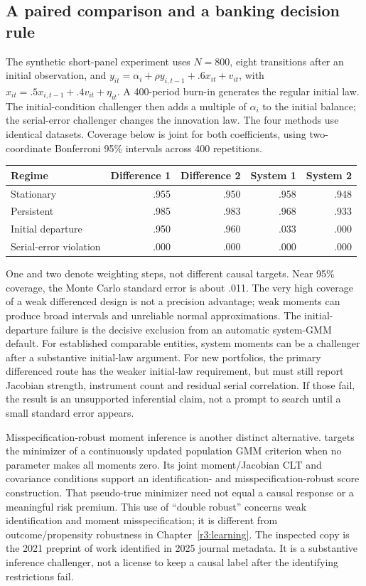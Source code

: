 \subsection{A paired comparison and a banking decision rule}
The synthetic short-panel experiment uses $N=800$, eight transitions after
an initial observation, and
$y_{it}=\alpha_i+\rho y_{i,t-1}+.6x_{it}+v_{it}$, with
$x_{it}=.5x_{i,t-1}+.4v_{it}+\eta_{it}$. A 400-period burn-in generates
the regular initial law. The initial-condition challenger then adds a
multiple of $\alpha_i$ to the initial balance; the serial-error challenger
changes the innovation law. The four methods use identical datasets.
Coverage below is joint for both coefficients, using two-coordinate
Bonferroni 95\% intervals across 400 repetitions.
\begin{center}\small
\begin{tabular}{lrrrr}\toprule
Regime & Difference 1 & Difference 2 & System 1 & System 2\\\midrule
Stationary & .955 & .950 & .958 & .948\\
Persistent & .985 & .983 & .968 & .933\\
Initial departure & .950 & .960 & .033 & .000\\
Serial-error violation & .000 & .000 & .000 & .000\\\bottomrule
\end{tabular}\end{center}
One and two denote weighting steps, not different causal targets. Near
95\% coverage, the Monte Carlo standard error is about .011. The very high
coverage of a weak differenced design is not a precision advantage; weak
moments can produce broad intervals and unreliable normal approximations.
The initial-departure failure is the decisive exclusion from an automatic
system-GMM default. For established comparable entities, system moments can
be a challenger after a substantive initial-law argument. For new portfolios,
the primary differenced route has the weaker initial-law requirement, but
must still report Jacobian strength, instrument count and residual serial
correlation. If those fail, the result is an unsupported inferential claim,
not a prompt to search until a small standard error appears.

Misspecification-robust moment inference is another distinct alternative.
\citet[Sections 2--3, Assumptions 1--2]{kleibergen2021} targets the minimizer
of a continuously updated population GMM criterion when no parameter makes
all moments zero. Its joint moment/Jacobian CLT and covariance conditions
support an identification- and misspecification-robust score construction.
That pseudo-true minimizer need not equal a causal response or a meaningful
risk premium. This use of ``double robust'' concerns weak identification and
moment misspecification; it is different from outcome/propensity robustness
in Chapter~\ref{r3:learning}. The inspected copy is the 2021 preprint of work
identified in 2025 journal metadata. It is a substantive inference challenger,
not a license to keep a causal label after the identifying restrictions fail.


